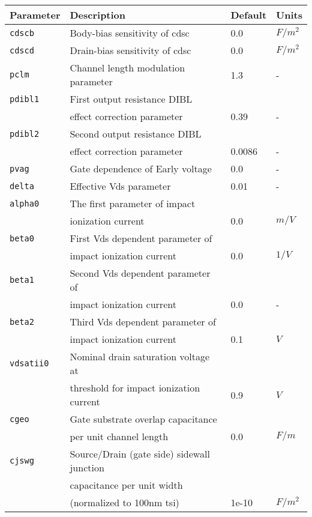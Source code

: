 \documentclass{article}
\begin{document}
\newpage
\begin{table}[H]
\begin{tabular}{|l| l| l| l|}
\hline
\textbf{Parameter} & \textbf{Description} & \textbf{Default} & \textbf{Units} \\
\hline
\texttt{cdscb} & Body-bias sensitivity of cdsc & 0.0 & $F/m^2$\\
\texttt{cdscd} & Drain-bias sensitivity of cdsc & 0.0 & $F/m^2$\\
\texttt{pclm} & Channel length modulation parameter & 1.3 & -\\
\texttt{pdibl1} & First output resistance DIBL & & \\
            & effect correction parameter & 0.39 & -\\
\texttt{pdibl2} & Second output resistance DIBL & & \\
             & effect correction parameter & 0.0086 & -\\
\texttt{pvag} & Gate dependence of Early voltage & 0.0 & -\\
\texttt{delta} & Effective Vds parameter & 0.01 & -\\
\texttt{alpha0} & The first parameter of impact & & \\
            & ionization current & 0.0 & $m/V$\\
\texttt{beta0} & First Vds dependent parameter of & & \\
            & impact ionization current & 0.0 & $1/V$\\
\texttt{beta1} & Second Vds dependent parameter of & & \\
            & impact ionization current & 0.0 & -\\
\texttt{beta2} & Third Vds dependent parameter of & &\\
                 & impact ionization current & 0.1 & $V$ \\
\texttt{vdsatii0} & Nominal drain saturation voltage at & &\\
                    & threshold for impact ionization current & 0.9 & $V$\\
\texttt{cgeo} & Gate substrate overlap capacitance & & \\
               & per unit channel length & 0.0 & $F/m$\\
\texttt{cjswg} & Source/Drain (gate side) sidewall junction & & \\
                & capacitance per unit width & &\\
                & (normalized to 100nm tsi) & 1e-10 & $F/m^2$\\

\end{tabular}
\end{table}
\end{document}
